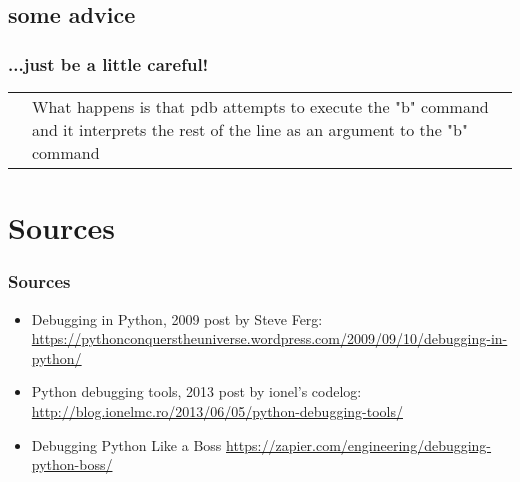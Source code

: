 \subsection{some advice}
\begin{frame}
\frametitle{...just be a little careful!}
\begin{table}
    \begin{tabular}{p{4.7cm}p{4.7cm}}
        &
        \lstset{basicstyle=\ttfamily\tiny}
        
        What happens is that pdb attempts to execute the "b" command and it interprets the rest of the line as an argument to the "b" command
    \end{tabular} 
\end{table}\end{frame}






\section{Sources}
\begin{frame}
\frametitle{Sources}	
\begin{itemize}
    \item Debugging in Python, 2009 post by Steve Ferg: \url{https://pythonconquerstheuniverse.wordpress.com/2009/09/10/debugging-in-python/}
    \item Python debugging tools, 2013 post by ionel's codelog: \url{http://blog.ionelmc.ro/2013/06/05/python-debugging-tools/}
    \item Debugging Python Like a Boss  \url{https://zapier.com/engineering/debugging-python-boss/}
\end{itemize}
\end{frame}





